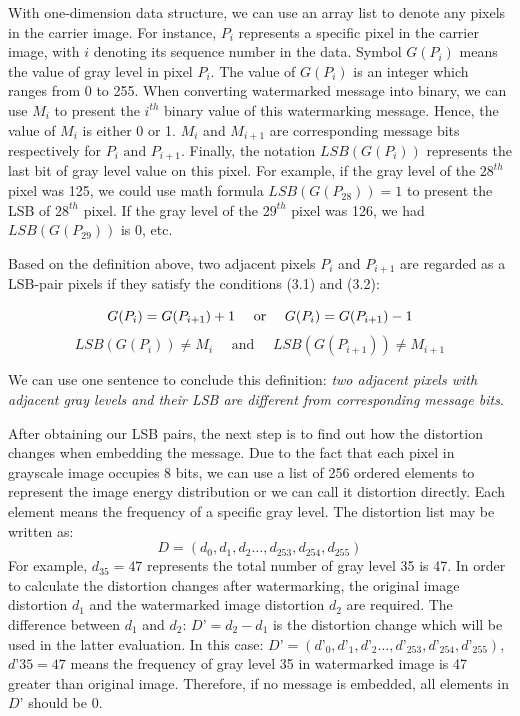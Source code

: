 With one-dimension data structure, we can use an array list to denote any pixels in the carrier image. For instance, \(P_{i}\) represents a specific pixel in the carrier image, with \(i\) denoting its sequence number in the data. Symbol \(G(P_{i})\) means the value of gray level in pixel \(P_{i}\). The value of \(G(P_{i})\) is an integer which ranges from 0 to 255. When converting watermarked message into binary, we can use \(M_{i}\) to present the \(i^{th}\) binary value of this watermarking message. Hence, the value of \(M_{i}\) is either 0 or 1. \(M_{i}\) and \(M_{i+1}\) are corresponding message bits respectively for \(P_{i} \text{ and } P_{i+1}\). Finally, the notation \(LSB(G(P_{i}))\) represents the last bit of gray level value on this pixel. For example, if the gray level of the \(28^{th}\) pixel was 125, we could use math formula \(LSB(G(P_{28})) = 1\) to present the LSB of \(28^{th}\) pixel. If the gray level of the \(29^{th}\) pixel was 126, we had \(LSB(G(P_{29}))\) is 0, etc. 

Based on the definition above, two adjacent pixels \(P_{i}\) and \(P_{i+1}\) are regarded as a LSB-pair pixels if they satisfy the conditions (3.1) and (3.2): 

\begin{equation}
\\ G(P_{i}) = G(P_{i+1}) + 1 \quad \text{ or } \quad G(P_{i}) = G(P_{i+1}) - 1
\end{equation}
\begin{equation}
LSB(G(P_{i})) \neq M_{i} \quad \text{ and } \quad LSB(G(P_{i+1})) \neq M_{i+1}
\end{equation}

We can use one sentence to conclude this definition: \textit{two adjacent pixels with adjacent gray levels and their LSB are different from corresponding message bits}.

After obtaining our LSB pairs, the next step is to find out how the distortion changes when embedding the message. Due to the fact that each pixel in grayscale image occupies 8 bits, we can use a list of 256 ordered elements to represent the image energy distribution or we can call it distortion directly. Each element means the frequency of a specific gray level. The distortion list may be written as:
\[D = (d_{0}, d_{1}, d_{2} … , d_{253}, d_{254}, d_{255})\]
For example, \(d_{35} = 47\) represents the total number of gray level 35 is 47. In order to calculate the distortion changes after watermarking, the original image distortion \(d_{1}\) and the watermarked image distortion \(d_{2}\) are required. The difference between \(d_{1}\) and \(d_{2}\): \(D’ = d_{2} - d_{1}\) is the distortion change which will be used in the latter evaluation. In this case: \(D’ = (d’_{0}, d’_{1}, d’_{2}…, d’_{253}, d’_{254}, d’_{255})\), \(d’35 = 47\) means the frequency of gray level 35 in watermarked image is 47 greater than original image. Therefore, if no message is embedded, all elements in \(D’\) should be 0.


